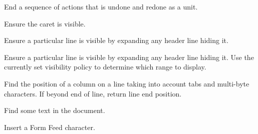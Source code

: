 
End a sequence of actions that is undone and redone as a unit.


\label{wxstyledtextctrlensurecaretvisible}


Ensure the caret is visible.


\label{wxstyledtextctrlensurevisible}


Ensure a particular line is visible by expanding any header line hiding it.


\label{wxstyledtextctrlensurevisibleenforcepolicy}


Ensure a particular line is visible by expanding any header line hiding it.
Use the currently set visibility policy to determine which range to display.


\label{wxstyledtextctrlfindcolumn}


Find the position of a column on a line taking into account tabs and
multi-byte characters. If beyond end of line, return line end position.


\label{wxstyledtextctrlfindtext}


Find some text in the document.


\label{wxstyledtextctrlformfeed}


Insert a Form Feed character.


\label{wxstyledtextctrlformatrange}


